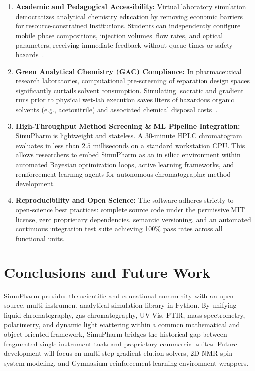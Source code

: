 \documentclass[final,5p,times,twocolumn]{elsarticle}
\begin{document}
\begin{enumerate}
    \item \textbf{Academic and Pedagogical Accessibility:} Virtual laboratory simulation democratizes analytical chemistry education by removing economic barriers for resource-constrained institutions. Students can independently configure mobile phase compositions, injection volumes, flow rates, and optical parameters, receiving immediate feedback without queue times or safety hazards~\cite{bosch2021virtual}.
    \item \textbf{Green Analytical Chemistry (GAC) Compliance:} In pharmaceutical research laboratories, computational pre-screening of separation design spaces significantly curtails solvent consumption. Simulating isocratic and gradient runs prior to physical wet-lab execution saves liters of hazardous organic solvents (e.g., acetonitrile) and associated chemical disposal costs~\cite{penapereira2020greenness}.
    \item \textbf{High-Throughput Method Screening \& ML Pipeline Integration:} SimuPharm is lightweight and stateless. A 30-minute HPLC chromatogram evaluates in less than $2.5 \text{ milliseconds}$ on a standard workstation CPU. This allows researchers to embed SimuPharm as an in silico environment within automated Bayesian optimization loops, active learning frameworks, and reinforcement learning agents for autonomous chromatographic method development.
    \item \textbf{Reproducibility and Open Science:} The software adheres strictly to open-science best practices: complete source code under the permissive MIT license, zero proprietary dependencies, semantic versioning, and an automated continuous integration test suite achieving 100\% pass rates across all functional units.
\end{enumerate}

\section{Conclusions and Future Work}
\label{sec:conclusions}

SimuPharm provides the scientific and educational community with an open-source, multi-instrument analytical simulation library in Python. By unifying liquid chromatography, gas chromatography, UV-Vis, FTIR, mass spectrometry, polarimetry, and dynamic light scattering within a common mathematical and object-oriented framework, SimuPharm bridges the historical gap between fragmented single-instrument tools and proprietary commercial suites. Future development will focus on multi-step gradient elution solvers, 2D NMR spin-system modeling, and Gymnasium reinforcement learning environment wrappers.
\end{document}
